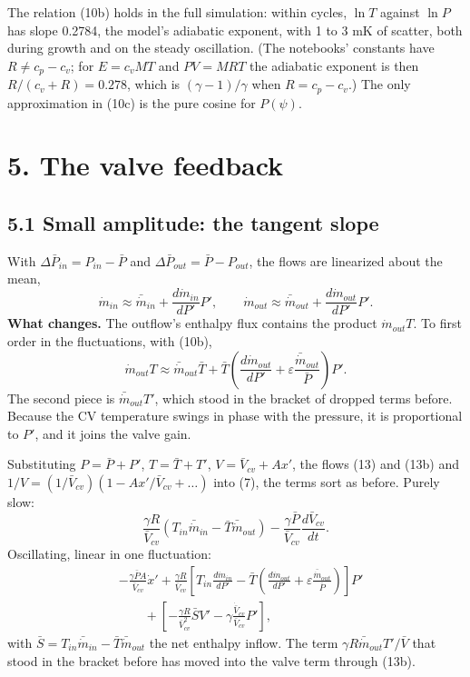 \documentclass[11pt]{article}
\begin{document}
The relation (10b) holds in the full simulation: within cycles, $\ln T$ against $\ln P$ has slope 0.2784, the model's adiabatic exponent, with 1 to 3 mK of scatter, both during growth and on the steady oscillation. (The notebooks' constants have $R \ne c_p - c_v$; for $E = c_vMT$ and $PV = MRT$ the adiabatic exponent is then $R/(c_v + R) = 0.278$, which is $(\gamma - 1)/\gamma$ when $R = c_p - c_v$.) The only approximation in (10c) is the pure cosine for $P(\psi)$.

\section*{5. The valve feedback}

\subsection*{5.1 Small amplitude: the tangent slope}

With $\Delta\bar P_{in} = P_{in} - \bar P$ and $\Delta\bar P_{out} = \bar P - P_{out}$, the flows are linearized about the mean,
\begin{equation}
\dot m_{in} \approx \bar{\dot m}_{in} + \frac{d\dot m_{in}}{dP'}P', \qquad \dot m_{out} \approx \bar{\dot m}_{out} + \frac{d\dot m_{out}}{dP'}P' . \tag{13}
\end{equation}
\textbf{What changes.} The outflow's enthalpy flux contains the product $\dot m_{out}T$. To first order in the fluctuations, with (10b),
\begin{equation}
\dot m_{out}T \approx \bar{\dot m}_{out}\bar T + \bar T\left(\frac{d\dot m_{out}}{dP'} + \varepsilon\frac{\bar{\dot m}_{out}}{\bar P}\right)P' . \tag{13b}
\end{equation}
The second piece is $\bar{\dot m}_{out}T'$, which stood in the bracket of dropped terms before. Because the CV temperature swings in phase with the pressure, it is proportional to $P'$, and it joins the valve gain.

Substituting $P = \bar P + P'$, $T = \bar T + T'$, $V = \bar V_{cv} + Ax'$, the flows (13) and (13b) and $1/V = (1/\bar V_{cv})(1 - Ax'/\bar V_{cv} + \dots)$ into (7), the terms sort as before. Purely slow:
\[
\frac{\gamma R}{\bar V_{cv}}\left(T_{in}\bar{\dot m}_{in} - \bar T\bar{\dot m}_{out}\right) - \frac{\gamma\bar P}{\bar V_{cv}}\frac{d\bar V_{cv}}{dt} .
\]
Oscillating, linear in one fluctuation:
\[
\begin{aligned}
&-\frac{\gamma\bar PA}{\bar V_{cv}}\dot x' + \frac{\gamma R}{\bar V_{cv}}\left[T_{in}\frac{d\dot m_{in}}{dP'} - \bar T\left(\frac{d\dot m_{out}}{dP'} + \varepsilon\frac{\bar{\dot m}_{out}}{\bar P}\right)\right]P' \\
&\qquad + \left[-\frac{\gamma R}{\bar V_{cv}^2}\bar SV' - \gamma\frac{\dot{\bar V}_{cv}}{\bar V_{cv}}P'\right],
\end{aligned}
\]
with $\bar S = T_{in}\bar{\dot m}_{in} - \bar T\bar{\dot m}_{out}$ the net enthalpy inflow. The term $\gamma R\bar{\dot m}_{out}T'/\bar V$ that stood in the bracket before has moved into the valve term through (13b).
\end{document}
